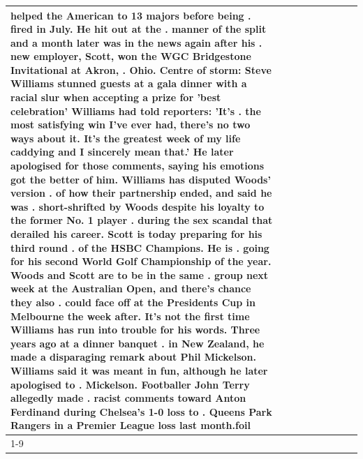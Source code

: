 \begin{table}[H]
\begin{tabular}{lllrlllll}
helped the American to 13 majors before being . fired in July. He hit out at the . manner of the split and a month later was in the news again after his . new employer, Scott, won the WGC Bridgestone Invitational at Akron, . Ohio. Centre of storm: Steve Williams stunned guests at a gala dinner with a racial slur when accepting a prize for 'best celebration' Williams had told reporters: 'It's . the most satisfying win I've ever had, there's no two ways about it. It's the greatest week of my life caddying and I sincerely mean that.' He later apologised for those comments, saying his emotions got the better of him. Williams has disputed Woods' version . of how their partnership ended, and said he was . short-shrifted by Woods despite his loyalty to the former No. 1 player . during the sex scandal that derailed his career. Scott is today preparing for his third round . of the HSBC Champions. He is . going for his second World Golf Championship of the year. Woods and Scott are to be in the same . group next week at the Australian Open, and there's chance they also . could face off at the Presidents Cup in Melbourne the week after. It's not the first time Williams has run into trouble for his words. Three years ago at a dinner banquet . in New Zealand, he made a disparaging remark about Phil Mickelson. Williams said it was meant in fun, although he later apologised to . Mickelson. Footballer John Terry allegedly made . racist comments toward Anton Ferdinand during Chelsea's 1-0 loss to . Queens Park Rangers in a Premier League loss last month.foil \\
\cline{1-9}

\end{tabular}
\end{table}
